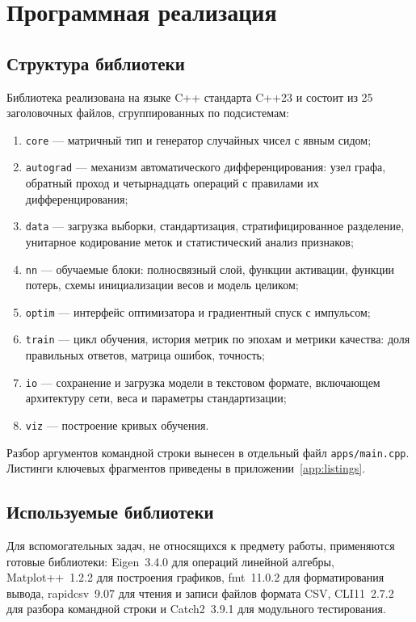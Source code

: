 \chapter{Программная реализация}\label{ch:impl}

\section{Структура библиотеки}

Библиотека реализована на языке C++ стандарта C++23 и состоит из 25 заголовочных файлов,
сгруппированных по подсистемам:

\begin{enumerate}
    \item \texttt{core} --- матричный тип и генератор случайных чисел с явным сидом;
    \item \texttt{autograd} --- механизм автоматического дифференцирования: узел графа,
          обратный проход и четырнадцать операций с правилами их дифференцирования;
    \item \texttt{data} --- загрузка выборки, стандартизация, стратифицированное
          разделение, унитарное кодирование меток и статистический анализ признаков;
    \item \texttt{nn} --- обучаемые блоки: полносвязный слой, функции активации, функции потерь, схемы
          инициализации весов и модель целиком;
    \item \texttt{optim} --- интерфейс оптимизатора и градиентный спуск с импульсом;
    \item \texttt{train} --- цикл обучения, история метрик по эпохам и метрики качества:
          доля правильных ответов, матрица ошибок, точность;
    \item \texttt{io} --- сохранение и загрузка модели в текстовом формате, включающем
          архитектуру сети, веса и параметры стандартизации;
    \item \texttt{viz} --- построение кривых обучения.
\end{enumerate}

Разбор аргументов командной строки вынесен в отдельный файл \texttt{apps/main.cpp}.
Листинги ключевых фрагментов приведены в приложении~\ref{app:listings}.

\section{Используемые библиотеки}

Для вспомогательных задач, не относящихся к предмету работы, применяются готовые
библиотеки: Eigen~3.4.0 для операций линейной алгебры, Matplot++~1.2.2 для построения
графиков, fmt~11.0.2 для форматирования вывода, rapidcsv~9.07 для чтения и записи файлов
формата CSV, CLI11~2.7.2 для разбора командной строки и Catch2~3.9.1 для модульного
тестирования.

